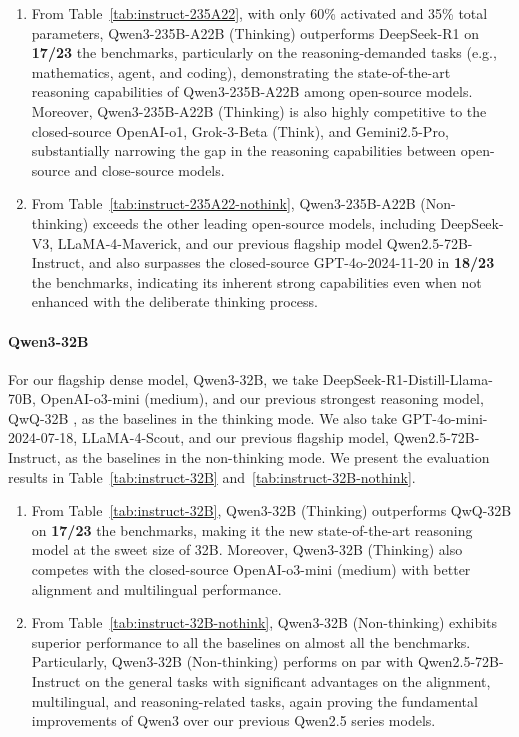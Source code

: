\begin{enumerate}[label=(\arabic*)]
    \item From Table~\ref{tab:instruct-235A22}, with only 60\% activated and 35\% total parameters, Qwen3-235B-A22B (Thinking) outperforms DeepSeek-R1 on \textbf{17/23} the benchmarks, particularly on the reasoning-demanded tasks (e.g., mathematics, agent, and coding), demonstrating the state-of-the-art reasoning capabilities of Qwen3-235B-A22B among open-source models.
    Moreover, Qwen3-235B-A22B (Thinking) is also highly competitive to the closed-source OpenAI-o1, Grok-3-Beta (Think), and Gemini2.5-Pro, substantially narrowing the gap in the reasoning capabilities between open-source and close-source models.
    \item From Table~\ref{tab:instruct-235A22-nothink}, Qwen3-235B-A22B (Non-thinking) exceeds the other leading open-source models, including DeepSeek-V3, LLaMA-4-Maverick, and our previous flagship model Qwen2.5-72B-Instruct, and also surpasses the closed-source GPT-4o-2024-11-20 in \textbf{18/23} the benchmarks, indicating its inherent strong capabilities even when not enhanced with the deliberate thinking process.
\end{enumerate}

\paragraph{Qwen3-32B}
For our flagship dense model, Qwen3-32B, we take DeepSeek-R1-Distill-Llama-70B, OpenAI-o3-mini (medium), and our previous strongest reasoning model, QwQ-32B \citep{qwq32b}, as the baselines in the thinking mode.
We also take GPT-4o-mini-2024-07-18, LLaMA-4-Scout, and our previous flagship model, Qwen2.5-72B-Instruct, as the baselines in the non-thinking mode.
We present the evaluation results in Table~\ref{tab:instruct-32B} and~\ref{tab:instruct-32B-nothink}.

\begin{enumerate}[label=(\arabic*)]
    \item From Table~\ref{tab:instruct-32B}, Qwen3-32B (Thinking) outperforms QwQ-32B on \textbf{17/23} the benchmarks, making it the new state-of-the-art reasoning model at the sweet size of 32B.
    Moreover, Qwen3-32B (Thinking) also competes with the closed-source OpenAI-o3-mini (medium) with better alignment and multilingual performance.
    \item From Table~\ref{tab:instruct-32B-nothink}, Qwen3-32B (Non-thinking) exhibits superior performance to all the baselines on almost all the benchmarks.
    Particularly, Qwen3-32B (Non-thinking) performs on par with Qwen2.5-72B-Instruct on the general tasks with significant advantages on the alignment, multilingual, and reasoning-related tasks, again proving the fundamental improvements of Qwen3 over our previous Qwen2.5 series models.
\end{enumerate}

